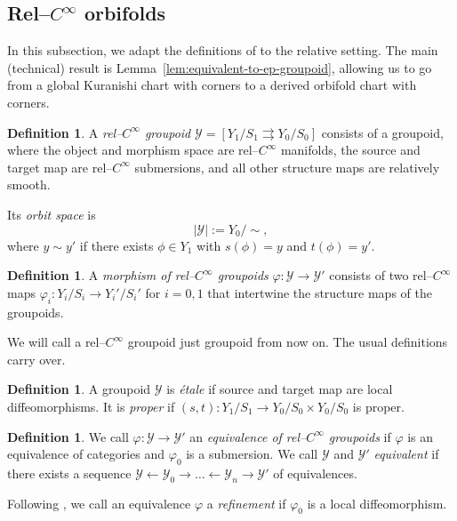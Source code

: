 \documentclass[11pt,psamsfonts, oneside, reqno]{amsart}
\newcommand{\cl}{\colon}
\newcommand{\cY}{\mathcal{Y}}
\theoremstyle{definition}
\newtheorem{definition}[theorem]{Definition}
\theoremstyle{remark}
\numberwithin{equation}{section}
\begin{document}
\subsection{Rel--$C^\infty$ orbifolds} In this subsection, we adapt the definitions of \cite{ST16} to the relative setting. The main (technical) result is Lemma~\ref{lem:equivalent-to-ep-groupoid}, allowing us to go from a global Kuranishi chart with corners to a derived orbifold chart with corners.

\begin{definition}\label{de:rel-smooth-groupoid} A \emph{rel--$C^\infty$ groupoid} $\cY = [Y_1/S_1 \rightrightarrows Y_0/S_0]$ consists of a groupoid, where the object and morphism space are rel--$C^\infty$ manifolds, the source and target map are rel--$C^\infty$ submersions, and all other structure maps are relatively smooth.\par Its \emph{orbit space} is $$|\cY| := Y_0/\sim,$$
	where $y \sim y'$ if there exists $\phi \in Y_1$ with $s(\phi) = y$ and $t(\phi) = y'$.
\end{definition}

\begin{definition}\label{de:rel-smooth-groupoid-map} A \emph{morphism of rel--$C^\infty$ groupoids} $\varphi \cl \cY\to \cY'$ consists of two rel--$C^\infty$ maps $\varphi_i \cl Y_i/S_i \to Y_i'/S_i'$ for $i = 0,1$ that intertwine the structure maps of the groupoids.
\end{definition}

\noindent
We will call a rel--$C^\infty$ groupoid just groupoid from now on. The usual definitions carry over.


\begin{definition}\label{de:ep-groupoid} A groupoid $\cY$ is \emph{\'etale} if source and target map are local diffeomorphisms. It is \emph{proper} if $(s,t) \cl Y_1/S_1 \to  Y_0/S_0\times Y_0/S_0$ is proper.
\end{definition}


\begin{definition}\label{de:equivalent-groupoids} We call $\varphi\cl \cY\to \cY'$ an \emph{equivalence of rel--$C^\infty$ groupoids} if $\varphi$ is an equivalence of categories and $\varphi_0$ is a submersion. We call $\cY$ and $\cY'$ \emph{equivalent} if there exists a sequence  $\cY\xleftarrow{}\cY_0\to\dots\leftarrow\cY_n \to\cY'$ of equivalences. 
\end{definition}

\noindent
Following \cite{ST23b}, we call an equivalence $\varphi$ a \emph{refinement} if $\varphi_0$ is a local diffeomorphism. 
\end{document}
